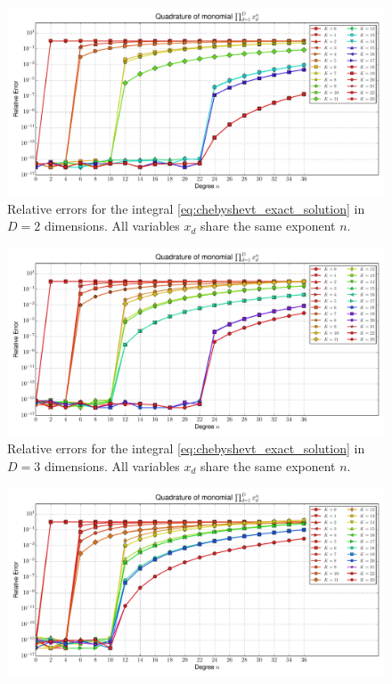 \documentclass[a4paper,10pt]{article}
\begin{document}
\begin{subfigures}
  \label{fig:monomial_errors_chebyshevt_multivariate}
  \begin{figure}\centering
    \includegraphics[width=\linewidth]{./img/monomial_errors_chebyshevt_multivariate_dimension_2.pdf}
    \caption{Relative errors for the integral \eqref{eq:chebyshevt_exact_solution}
    in $D=2$ dimensions. All variables $x_d$ share the same exponent $n$.}
    \label{fig:monomial_errors_chebyshevt_multivariate_dimension_2}
  \end{figure}
  \begin{figure}\centering
    \includegraphics[width=\linewidth]{./img/monomial_errors_chebyshevt_multivariate_dimension_3.pdf}
    \caption{Relative errors for the integral \eqref{eq:chebyshevt_exact_solution}
    in $D=3$ dimensions. All variables $x_d$ share the same exponent $n$.}
    \label{fig:monomial_errors_chebyshevt_multivariate_dimension_3}
  \end{figure}
  \begin{figure}\centering
    \includegraphics[width=\linewidth]{./img/monomial_errors_chebyshevt_multivariate_dimension_4.pdf}

\end{figure}
\end{subfigures}
\end{document}
